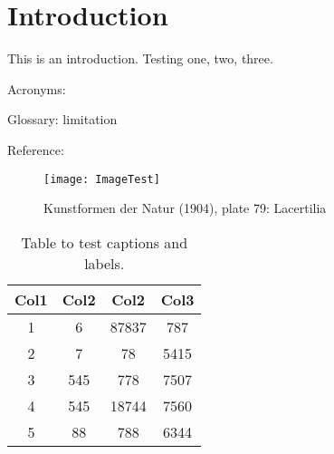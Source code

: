 \documentclass[class=myArticleClass, float=false, crop=false]{standalone}
\begin{document}
\section{Introduction}
This is an introduction. Testing one, two, three.

Acronyms: 

Glossary: \gls{limitation}

Reference: \cite{knuthwebsite}

\begin{figure}[h]
	\texttt{[image: ImageTest]}
	\label{fig:mesh1}
	\caption{Kunstformen der Natur (1904), plate 79: Lacertilia}
\end{figure}

\begin{table}[h!]
	\centering
	\begin{tabular}{||c c c c||} 
	 \hline
	 Col1 & Col2 & Col2 & Col3 \\ [0.5ex] 
	 \hline\hline
	 1 & 6 & 87837 & 787 \\ 
	 2 & 7 & 78 & 5415 \\
	 3 & 545 & 778 & 7507 \\
	 4 & 545 & 18744 & 7560 \\
	 5 & 88 & 788 & 6344 \\ [1ex] 
	 \hline
	\end{tabular}
	\caption{Table to test captions and labels.}
	\label{tab:1}
\end{table}
\end{document}
